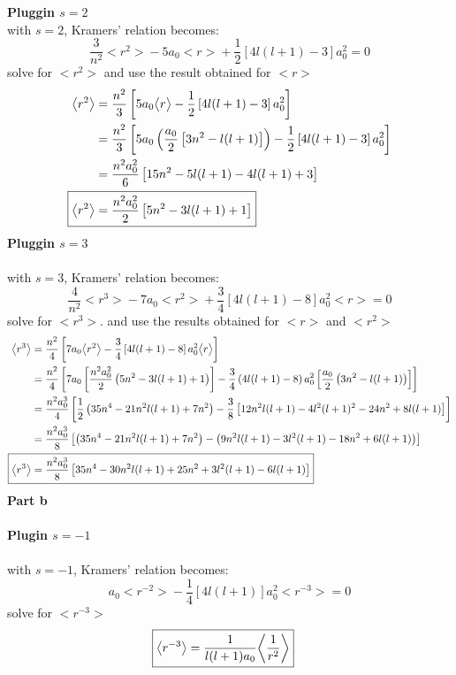 \documentclass[12 pt]{article}
\numberwithin{equation}{section}
\begin{document}
\textbf{Pluggin $s=2$}
\\
with $s=2$, Kramers' relation becomes:
\[
  \frac{3}{n^2}\big<r^2\big>-5a_0\big<r\big> + \frac{1}{2}\left[4l(l+1)-3\right]a_0^2 = 0
\]
solve for $\big<r^2\big>$ and use the result obtained for $\big<r\big>$
\begin{align*}
  \big<r^2\big>&= \frac{n^2}{3}\left[5a_0\big<r\big> - \frac{1}{2}\left[4l(l+1)-3\right]a_0^2 
  \right]\\
&=\frac{n^2}{3}\left[5a_0\left(\frac{a_0}{2}\left[3n^2- l(l+1)\right]\right)
- \frac{1}{2}\left[4l(l+1)-3\right]a_0^2\right]\\
&= \frac{n^2a_0^2}{6}\left[15n^2 -5l(l+1) - 4l(l+1)+3\right]\\
    \Aboxed{\big<r^2\big>&=\frac{n^2a_0^2}{2}\left[5n^2 -3l(l+1)+1\right] }
\end{align*}
\textbf{Pluggin $s=3$}\\
\\
with $s=3$, Kramers' relation becomes:
\[
  \frac{4}{n^2}\big<r^3\big> - 7a_0\big<r^2\big> + \frac{3}{4}\left[4l(l+1)-8\right]a_0^2\big<r
  \big>=0
\]
solve for $\big<r^3\big>$. and use the results obtained for $\big<r\big>$ and $\big<r^2\big>$
\begin{align*}
  \big<r^3\big>&=\frac{n^2}{4}\left[7a_0\big<r^2\big>-\frac{3}{4}\left[4l(l+1)-8\right]
  a_0^2\big<r\big>\right]\\
  &=\frac{n^2}{4}\left[7a_0\left[\frac{n^2a_0^2}{2}\left(5n^2 -3l(l+1)+1\right) \right] 
  -\frac{3}{4}\left(4l(l+1)-8\right)a_0^2\left[\frac{a_0}{2}\left(3n^2- l(l+1)\right)\right]
\right] \\
  &= \frac{n^2a_0^3}{4}\left[\frac{1}{2}\left(35n^4-21n^2l(l+1)+7n^2 \right)
    -\frac{3}{8}\left[12n^2l(l+1)-4l^2(l+1)^2 -24n^2+8l(l+1)\right]\right]\\
  &= \frac{n^2a_0^3}{8}\left[\left(35n^4-21n^2l(l+1)+7n^2 \right)-
  \left(9n^2l(l+1)-3l^2(l+1)-18n^2+6l(l+1) \right)\right]\\
\Aboxed{\big<r^3\big> &= \frac{n^2a_0^3}{8}\left[35n^4 - 30n^2l(l+1) +25n^2+3l^2(l+1)-6l(l+1)
\right]}
\end{align*}
\textbf{Part b}\\
\\
\textbf{Plugin $s = -1$}\\
\\
with $s=-1$, Kramers' relation becomes:
\[
  a_0 \big<r^{-2}\big>-\frac{1}{4}\left[4l(l+1)\right]a_0^2\big<r^{-3}\big>=0 
\]
solve for $\big<r^{-3}\big>$ 
\begin{align*}
  \Aboxed{\big<r^{-3}\big> &= \frac{1}{l(l+1)a_0}\bigg<\frac{1}{r^2}\bigg>}
\end{align*}
\end{document}
